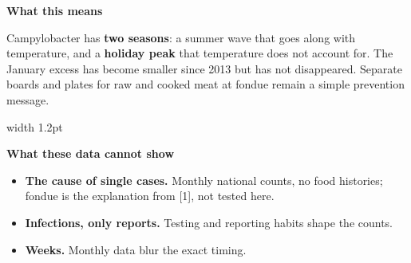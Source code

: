 \documentclass{article}
\begin{document}
\vspace{10pt}
\begin{tcolorbox}[enhanced,colback=ink,colframe=ink,arc=6pt,boxrule=0pt,left=26pt,right=26pt,top=18pt,bottom=18pt,boxsep=0pt]
\color{white}
\begin{minipage}[t]{0.555\linewidth}\vspace{0pt}
{\fontsize{25}{30}\selectfont\bfseries What this means\par}\vspace{8pt}
{\fontsize{20}{26}\selectfont Campylobacter has \textbf{two seasons}: a summer wave that goes along with temperature, and a \textbf{holiday peak} that temperature does not account for. The January excess has become smaller since 2013 but has not disappeared. Separate boards and plates for raw and cooked meat at fondue remain a simple prevention message.\par}
\end{minipage}\hfill
{\color{white!35!ink}\vrule width 1.2pt}\hfill
\begin{minipage}[t]{0.39\linewidth}\vspace{0pt}
{\fontsize{25}{30}\selectfont\bfseries What these data cannot show\par}\vspace{8pt}
{\fontsize{18.5}{23.5}\selectfont
\begin{itemize}[label={\color{white!60!ink}\textbullet},itemsep=6pt]
\item \textbf{The cause of single cases.} Monthly national counts, no food histories; fondue is the explanation from [1], not tested here.
\item \textbf{Infections, only reports.} Testing and reporting habits shape the counts.
\item \textbf{Weeks.} Monthly data blur the exact timing.
\end{itemize}\par}
\end{minipage}
\end{tcolorbox}
\end{document}
